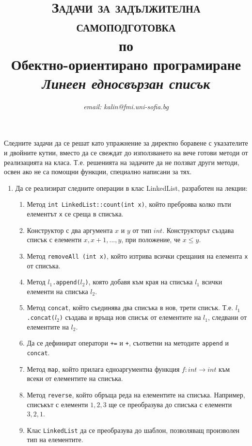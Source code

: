 \documentclass[12pt,a4paper]{article}
\author{\textit{email: kalin@fmi.uni-sofia.bg}}
\title{\textsc{Задачи за задължителна самоподготовка} \\
по \\
Обектно-ориентирано програмиране\\
\textit{Линеен едносвързан списък}}
\newcommand{\code}[1]{\texttt{#1}}
\begin{document}
\maketitle

Следните задачи да се решат като упражнение за директно боравене с указателите и двойните кутии, вместо да се свеждат до използването на вече готови методи от реализацията на класа. Т.е. решенията на задачите да не ползват други методи, освен ако не са помощни функции, специално написани за тях.

\begin{enumerate}

	\item Да се реализират следните операции в клас LinkedList, разработен на лекции:

	\begin{enumerate}
	  \item Метод \code{int LinkedList::count(int x)}, който преброява колко пъти елементът \code{x} се среща в списъка.
		\item Конструктор с два аргумента $x$ и $y$ от тип $int$. Конструкторът създава списък с елементи $x, x+1, ..., y$, при положение, че $x \leq y$.
		\item Метод \code{removeAll (int x)}, който изтрива всички срещания на елемента \code{x} от списъка.
		\item Метод \code{$l_1$.append($l_2$)}, която добавя към края на списъка $l_1$ всички елементи на списъка $l_2$.
		\item Метод \code{concat}, който съединява два списъка в нов, трети списък. Т.е. \code{$l_1$.concat($l_2$)} създава и връща нов списък от елементите на \code{$l_1$}, следвани от елементите на \code{$l_2$}.
		\item Да се дефинират оператори \code{+=} и \code{+}, съответни на методите \code{append} и \code{concat}.
		\item Метод \code{map}, който прилага едноаргументна функция $f:int \rightarrow int$ към всеки от елементите на списъка.
		\item Метод \code{reverse}, който обръща реда на елементите на списъка. Например, списъкът с елементи $1,2,3$ ще се преобразува до списъка с елементи $3,2,1$.
		\item Клас \code{LinkedList} да се преобразува до шаблон, позволяващ произволен тип на елементите.
	\end{enumerate}
\end{enumerate}


	\vspace{20px}
\end{document}
